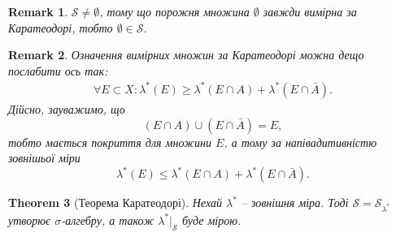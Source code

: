 \documentclass[a4paper, 10pt]{article}
\theoremstyle{theoremdd}
\newtheorem{theorem}{Theorem}[subsection]
\newtheorem{remark}[theorem]{Remark}
\begin{document}
\begin{remark}
$\mathcal{S} \neq \emptyset$, тому що порожня множина $\emptyset$ завжди вимірна за Каратеодорі, тобто $\emptyset \in \mathcal{S}$.
\end{remark}

\begin{remark}
Означення вимірних множин за Каратеодорі можна дещо послабити ось так:
\begin{align*}
\forall E \subset X: \lambda^*(E) \geq \lambda^*(E \cap A) + \lambda^*(E \cap \bar{A}).
\end{align*}
Дійсно, зауважимо, що
\[
(E \cap A) \cup (E \cap \bar{A}) = E,
\] тобто мається покриття для множини $E$, а тому за напівадитивністю зовнішьої міри
\[
\lambda^*(E) \leq \lambda^*(E \cap A) + \lambda^*(E \cap \bar{A}).
\]
\end{remark}

\begin{theorem}[Теорема Каратеодорі]
Нехай $\lambda^*$ -- зовнішня міра. Тоді $\mathcal{S} = \mathcal{S}_{\lambda^*}$ утворює $\sigma$-алгебру, а також $\lambda^*|_{\mathcal{S}}$ буде мірою.
\end{theorem}
\end{document}
